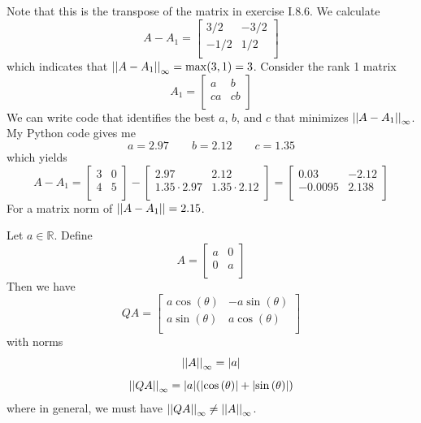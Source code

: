 \documentclass[a4paper]{article}
\begin{document}
Note that this is the transpose of the matrix in exercise I.8.6. We calculate
\[
	A - A_{1} =
	\begin{bmatrix}
		3/2 & -3/2 \\
		-1/2 & 1/2 \\
	\end{bmatrix}
\]
which indicates that \(\abs{\abs{A - A_{1}}}_{\infty} = \max \!\left( 3, 1 \right) = 3\). Consider the rank 1 matrix
\[
	A_{1} = 
	\begin{bmatrix}
		a & b \\
		ca & cb \\
	\end{bmatrix}
\]
We can write code that identifies the best \(a\), \(b\), and \(c\) that minimizes \(\abs{\abs{A - A_{1}}}_{\infty}\). My Python code gives me
\[
	a = 2.97 \qquad b = 2.12 \qquad c = 1.35
\]
which yields
\[
	A - A_{1} =
	\begin{bmatrix}
		3 & 0 \\
		4 & 5 \\
	\end{bmatrix}
	-
	\begin{bmatrix}
		2.97 & 2.12 \\
		1.35 \cdot 2.97 & 1.35 \cdot 2.12 \\
	\end{bmatrix}
	=
	\begin{bmatrix}
		0.03 & -2.12 \\
		-0.0095 & 2.138 \\
	\end{bmatrix}
\]
For a matrix norm of \(\abs{\abs{A - A_{1}}} = 2.15\).

\vspace{12pt}


Let \(a \in \mathbb{R}\). Define 
\[
	A = 
	\begin{bmatrix}
		a & 0 \\
		0 & a \\
	\end{bmatrix}
\]
Then we have
\[
	QA = 
	\begin{bmatrix}
		a \cos\left( \theta  \right) & -a \sin\left( \theta  \right) \\
		a \sin\left( \theta  \right) & a \cos\left( \theta  \right) \\
	\end{bmatrix}
\]
with norms
\[
	\abs{\abs{A}}_{\infty} = \abs{a}
\]
\[
	\abs{\abs{QA}}_{\infty} = \abs{a} \!\left( \abs{\cos\left( \theta  \right)} + \abs{\sin\left( \theta  \right)} \right) 
\]
where in general, we must have \(\abs{\abs{QA}}_{\infty} \neq \abs{\abs{A}}_{\infty}\).
\end{document}
